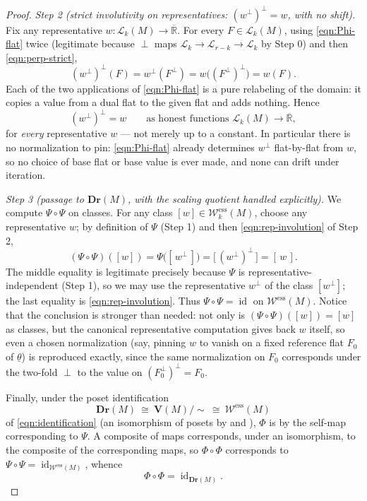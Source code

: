 \documentclass{article}
\theoremstyle{definition}
\newcommand{\Rbar}{\overline{\mathbb{R}}}
\newcommand{\Dr}{\mathbf{Dr}}
\newcommand{\bV}{\mathbf V}
\newcommand{\cLL}{\mathcal{L}}
\newcommand{\cW}{\mathcal{W}}
\begin{document}
\begin{proof}
\smallskip
\noindent\emph{Step 2 (strict involutivity on representatives: $(w^{\perp})^{\perp}=w$, with no
shift).}
Fix any representative $w\colon\cLL_k(M)\to\Rbar$. For every $F\in\cLL_k(M)$, using
\eqref{eqn:Phi-flat} twice (legitimate because $\perp$ maps $\cLL_k\to\cLL_{r-k}\to\cLL_k$ by Step 0)
and then \eqref{eqn:perp-strict},
\[
  (w^{\perp})^{\perp}(F)=w^{\perp}(F^{\perp})=w\bigl((F^{\perp})^{\perp}\bigr)=w(F).
\]
Each of the two applications of \eqref{eqn:Phi-flat} is a pure relabeling of the domain: it copies a
value from a dual flat to the given flat and adds nothing. Hence
\begin{equation}\label{eqn:rep-involution}
  (w^{\perp})^{\perp}=w\qquad\text{as honest functions }\cLL_k(M)\to\Rbar,
\end{equation}
for \emph{every} representative $w$ --- not merely up to a constant. In particular there is no
normalization to pin: \eqref{eqn:Phi-flat} already determines $w^{\perp}$ flat-by-flat from $w$, so
no choice of base flat or base value is ever made, and none can drift under iteration.

\smallskip
\noindent\emph{Step 3 (passage to $\Dr(M)$, with the scaling quotient handled explicitly).}
We compute $\Psi\circ\Psi$ on classes. For any class $[w]\in\cW^{\mathrm{ess}}_k(M)$, choose any
representative $w$; by definition of $\Psi$ (Step 1) and then \eqref{eqn:rep-involution} of Step 2,
\[
  (\Psi\circ\Psi)([w])=\Psi\bigl([\,w^{\perp}\,]\bigr)=\bigl[\,(w^{\perp})^{\perp}\,\bigr]=[\,w\,].
\]
The middle equality is legitimate precisely because $\Psi$ is representative-independent (Step 1), so
we may use the representative $w^{\perp}$ of the class $[w^{\perp}]$; the last equality is
\eqref{eqn:rep-involution}. Thus $\Psi\circ\Psi=\operatorname{id}$ on $\cW^{\mathrm{ess}}(M)$. Notice
that the conclusion is stronger than needed: not only is $(\Psi\circ\Psi)([w])=[w]$ as classes, but
the canonical representative computation gives back $w$ itself, so even a chosen normalization (say,
pinning $w$ to vanish on a fixed reference flat $F_0$ of $\underline\theta$) is reproduced exactly,
since the same normalization on $F_0$ corresponds under the two-fold $\perp$ to the value on
$(F_0^{\perp})^{\perp}=F_0$.

Finally, under the poset identification
\[
  \Dr(M)\ \cong\ \bV(M)/\!\sim\ \cong\ \cW^{\mathrm{ess}}(M)
\]
of \eqref{eqn:identification} (an isomorphism of posets by  and
), $\Phi$ is by  the self-map corresponding to $\Psi$.
A composite of maps corresponds, under an isomorphism, to the composite of the corresponding maps, so
$\Phi\circ\Phi$ corresponds to $\Psi\circ\Psi=\operatorname{id}_{\cW^{\mathrm{ess}}(M)}$, whence
\[
  \Phi\circ\Phi=\operatorname{id}_{\Dr(M)} .
\]


\end{proof}
\end{document}
